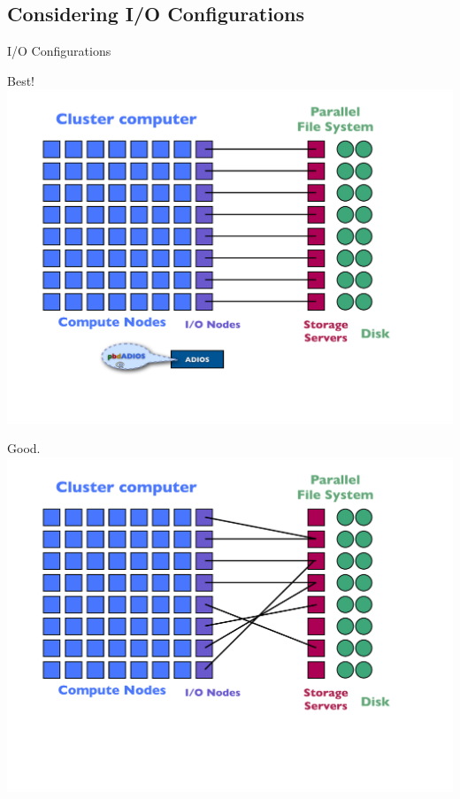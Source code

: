 \subsection{Considering I/O Configurations}
\makesubcontentsslidessec

\begin{frame}{I/O Configurations}
  \begin{minipage}{0.32\textwidth}
    \begin{block}{Best!}
      \includegraphics[trim=0 140 30 40,clip,width=1\textwidth]{../common/pics/hardware/ParallelHardware20.pdf}
    \end{block}
  \end{minipage}\hspace{1ex}
  \begin{minipage}{0.32\textwidth}
    \begin{block}{Good.}
      \includegraphics[trim=0 140 30 40,clip,width=1\textwidth]{../common/pics/hardware/ParallelHardware19.pdf}

\end{block}
\end{minipage}
\end{frame}
